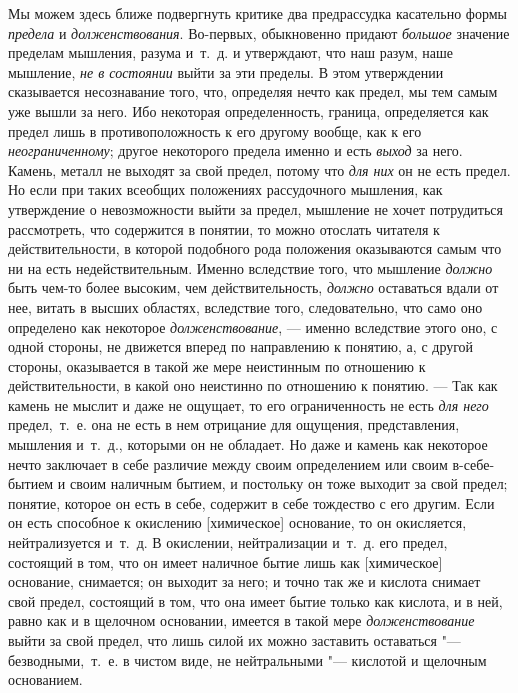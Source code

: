 Мы можем здесь ближе подвергнуть критике два предрассудка касательно формы
{\em предела} и
{\em долженствования}. Во-первых, обыкновенно придают
{\em большое} значение пределам мышления, разума
и~т.~д. и утверждают, что наш разум, наше мышление,
{\em не в состоянии} выйти за эти пределы. В этом
утверждении сказывается несознавание того, что, определяя нечто как предел,
мы тем самым уже вышли за него. Ибо некоторая определенность, граница,
определяется как предел лишь в противоположность к его другому вообще, как
к его {\em неограниченному}; другое некоторого предела
именно и есть {\em выход} за него. Камень, металл не
выходят за свой предел, потому что {\em для них} он не
есть предел. Но если при таких всеобщих положениях рассудочного мышления,
как утверждение о невозможности выйти за предел, мышление не хочет
потрудиться рассмотреть, что содержится в понятии, то можно отослать
читателя к действительности, в которой подобного рода положения оказываются
самым что ни на есть недействительным. Именно вследствие того, что мышление
{\em должно} быть чем-то более высоким, чем
действительность, {\em должно} оставаться вдали от нее,
витать в высших областях, вследствие того, следовательно, что само оно
определено как некоторое {\em долженствование}, —
именно вследствие этого оно, с одной стороны, не движется вперед по
направлению к понятию, а, с другой стороны, оказывается в такой же мере
неистинным по отношению к действительности, в какой оно неистинно по
отношению к понятию. — Так как камень не мыслит и даже не ощущает, то его
ограниченность не есть {\em для него} предел,~т.~е. она
не есть в нем отрицание для ощущения, представления, мышления и~т.~д.,
которыми он не обладает. Но даже и камень как некоторое нечто заключает в
себе различие между своим определением или своим в-себе-бытием и своим
наличным бытием, и постольку он тоже выходит за свой предел; понятие,
которое он есть в себе, содержит в себе тождество с его другим. Если он
есть способное к окислению [химическое] основание, то он окисляется,
нейтрализуется и~т.~д. В окислении, нейтрализации и~т.~д. его предел,
состоящий в том, что он имеет наличное бытие лишь как [химическое]
основание, снимается; он выходит за него; и точно так же и кислота снимает
свой предел, состоящий в том, что она имеет бытие только как кислота, и в
ней, равно как и в щелочном основании, имеется в такой мере
{\em долженствование} выйти за свой предел, что лишь
силой их можно заставить оставаться "--- безводными,~т.~е. в чистом виде, не
нейтральными "--- кислотой и щелочным основанием.

